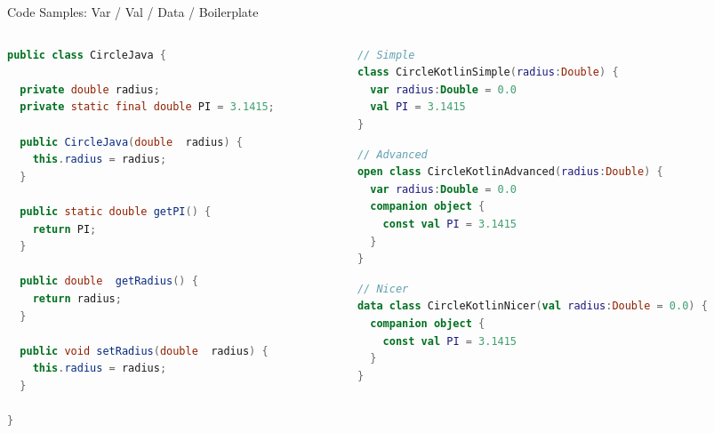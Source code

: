 \begin{frame}[fragile]{Code Samples: Var / Val / Data / Boilerplate}
	\begin{columns}
		\begin{column}{0.5\textwidth}
\begin{lstlisting}[language=Java,basicstyle=\ttfamily\tiny]
public class CircleJava {

  private double radius;
  private static final double PI = 3.1415;

  public CircleJava(double  radius) {
    this.radius = radius;
  }

  public static double getPI() {
    return PI;
  }

  public double  getRadius() {
    return radius;
  }

  public void setRadius(double  radius) {
    this.radius = radius;
  }

}
\end{lstlisting}
		\end{column}
		\begin{column}{0.5\textwidth}
\begin{lstlisting}[language=Kotlin,basicstyle=\ttfamily\tiny]
// Simple
class CircleKotlinSimple(radius:Double) {
  var radius:Double = 0.0
  val PI = 3.1415
}
\end{lstlisting}
\begin{lstlisting}[language=Kotlin,basicstyle=\ttfamily\tiny]
// Advanced
open class CircleKotlinAdvanced(radius:Double) {
  var radius:Double = 0.0
  companion object {
    const val PI = 3.1415
  }
}
\end{lstlisting}
\begin{lstlisting}[language=Kotlin,basicstyle=\ttfamily\tiny]
// Nicer
data class CircleKotlinNicer(val radius:Double = 0.0) {
  companion object {
    const val PI = 3.1415
  }
}
\end{lstlisting}
		\end{column}
	\end{columns}
\end{frame}

